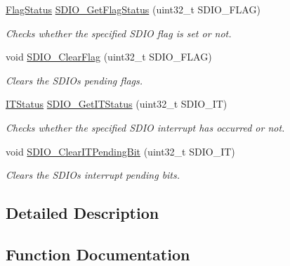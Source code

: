 \begin{DoxyCompactItemize}
\mbox{\hyperlink{group___exported__types_ga89136caac2e14c55151f527ac02daaff}{Flag\+Status}} \mbox{\hyperlink{group___s_d_i_o___private___functions_ga644514b4b3c95c5c4326d99cd166f6f9}{S\+D\+I\+O\+\_\+\+Get\+Flag\+Status}} (uint32\+\_\+t S\+D\+I\+O\+\_\+\+F\+L\+AG)
\begin{DoxyCompactList}\small\item\em Checks whether the specified S\+D\+IO flag is set or not. \end{DoxyCompactList}\item 
void \mbox{\hyperlink{group___s_d_i_o___private___functions_ga7aff4efdeb528229135f9f285e53518a}{S\+D\+I\+O\+\_\+\+Clear\+Flag}} (uint32\+\_\+t S\+D\+I\+O\+\_\+\+F\+L\+AG)
\begin{DoxyCompactList}\small\item\em Clears the S\+D\+IO\textquotesingle{}s pending flags. \end{DoxyCompactList}\item 
\mbox{\hyperlink{group___exported__types_gaacbd7ed539db0aacd973a0f6eca34074}{I\+T\+Status}} \mbox{\hyperlink{group___s_d_i_o___private___functions_ga2d64af1f3df0f99cb518f9a89bbd02ac}{S\+D\+I\+O\+\_\+\+Get\+I\+T\+Status}} (uint32\+\_\+t S\+D\+I\+O\+\_\+\+IT)
\begin{DoxyCompactList}\small\item\em Checks whether the specified S\+D\+IO interrupt has occurred or not. \end{DoxyCompactList}\item 
void \mbox{\hyperlink{group___s_d_i_o___private___functions_ga048e07fd86321cd01b2a22c071c3149b}{S\+D\+I\+O\+\_\+\+Clear\+I\+T\+Pending\+Bit}} (uint32\+\_\+t S\+D\+I\+O\+\_\+\+IT)
\begin{DoxyCompactList}\small\item\em Clears the S\+D\+IO\textquotesingle{}s interrupt pending bits. \end{DoxyCompactList}\end{DoxyCompactItemize}


\subsection{Detailed Description}


\subsection{Function Documentation}
\mbox{\label{group___s_d_i_o___private___functions_gab44b8cbc21be000a291563076159503b}} 
